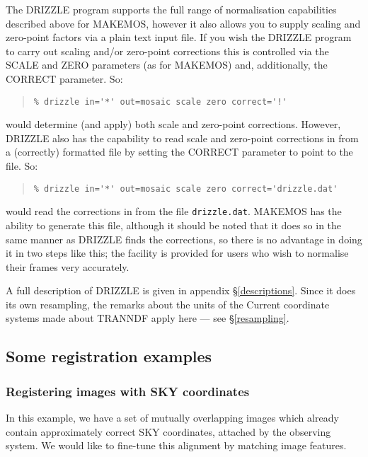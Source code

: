 \documentclass[twoside,11pt]{article}
\newcommand{\hyperref}[4]{#2\ref{#4}#3}
\newcommand{\htmlref}[2]{#1}
\newcommand{\xlabel}[1]{}
\renewcommand{\_}{\texttt{\symbol{95}}}
\newenvironment{myquote}{\begin{quote}\begin{small}}{\end{small}\end{quote}}
\newcommand{\routine}[1]{{\sc #1}}
\newcommand{\xroutine}[1]{\htmlref{{\sc #1}}{#1}}
\begin{document}
The \routine{DRIZZLE} program supports the full range of normalisation
capabilities described above for \routine{MAKEMOS}, however
it also allows you to supply scaling and zero-point factors via a
plain text input file.
If you wish the \routine{DRIZZLE} program to carry out scaling and/or
zero-point corrections this is controlled via the SCALE and
ZERO parameters (as for \routine{MAKEMOS}) and, additionally,
the CORRECT parameter. So:
\begin{myquote}
\begin{verbatim}
% drizzle in='*' out=mosaic scale zero correct='!'
\end{verbatim}
\end{myquote}
would determine (and apply) both scale and zero-point corrections. However,
\routine{DRIZZLE} also has the capability to read scale and zero-point
corrections in from a (correctly) formatted file by setting the
CORRECT parameter to point to the file. So:
\begin{myquote}
\begin{verbatim}
% drizzle in='*' out=mosaic scale zero correct='drizzle.dat'
\end{verbatim}
\end{myquote}
would read the corrections in from the file {\tt drizzle.dat}. 
\routine{MAKEMOS} has the ability to generate this file,
although it should be noted that it does so in the same manner as
\routine{DRIZZLE} finds the corrections, so there is no advantage in
doing it in two steps like this; the facility is provided 
for users who wish to normalise their frames very accurately. 

A full description of \xroutine{DRIZZLE} is
given in appendix \S\ref{descriptions}.
Since it does its own resampling, the remarks 
about the units of the Current coordinate systems made about
\routine{TRANNDF} apply here --- 
see \hyperref{the section on resampling}{\S }{}{resampling}.



\subsection{\xlabel{regexamples}\label{regexamples}Some registration examples}

\subsubsection{Registering images with SKY coordinates}

In this example, we have a set of mutually overlapping 
images which already contain approximately correct 
SKY coordinates, attached by the observing system.
We would like to fine-tune this alignment by matching image features.
\end{document}
